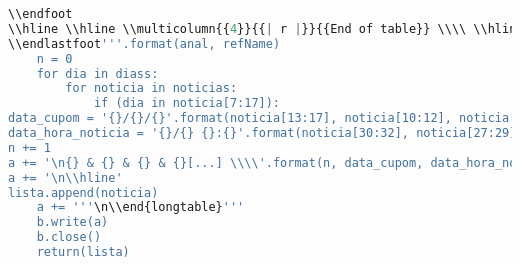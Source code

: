 \begin{lstlisting}[language=Python]
\\endfoot
\\hline \\hline \\multicolumn{{4}}{{| r |}}{{End of table}} \\\\ \\hline
\\endlastfoot'''.format(anal, refName)
    n = 0
    for dia in diass:
        for noticia in noticias:
            if (dia in noticia[7:17]):
data_cupom = '{}/{}/{}'.format(noticia[13:17], noticia[10:12], noticia[7:9])
data_hora_noticia = '{}/{} {}:{}'.format(noticia[30:32], noticia[27:29], noticia[45:47], noticia[57:59])
n += 1
a += '\n{} & {} & {} & {}[...] \\\\'.format(n, data_cupom, data_hora_noticia, noticia[noticia.find('titulo')+8:noticia.find('titulo')+49])
a += '\n\\hline'
lista.append(noticia)
    a += '''\n\\end{longtable}'''
    b.write(a)
    b.close()
    return(lista)








\end{lstlisting}